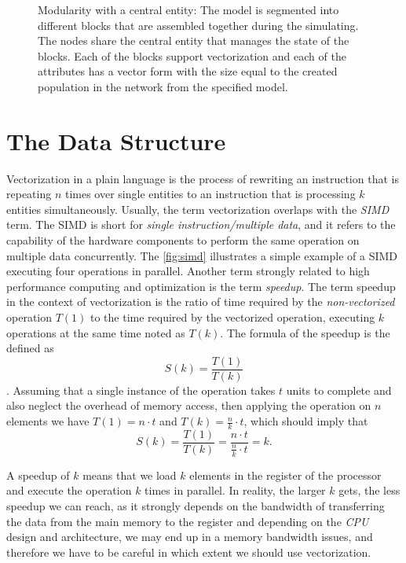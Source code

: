 \begin{figure}[ht!]
\begin{tikzpicture}[x=0.75pt,y=0.75pt,yscale=-1,xscale=1]
\end{tikzpicture}

    \caption{Modularity with a central entity: The model is segmented into different blocks that are assembled together during the simulating. The nodes share the central entity that manages the state of the blocks. Each of the blocks support vectorization and each of the attributes has a vector form with the size equal to the created population in the network from the specified model.}
    \label{fig:central_entity}
\end{figure}

\section{The Data Structure}

Vectorization in a plain language is the process of rewriting an instruction that is repeating $n$ times over single entities to an instruction that is processing $k$ entities simultaneously. Usually, the term vectorization overlaps with the \emph{SIMD} term. The SIMD is short for \emph{single instruction/multiple data}, and it refers to the capability of the hardware components to perform the same operation on multiple data concurrently. The \autoref{fig:simd} illustrates a simple example of a SIMD executing  four operations in parallel. Another term strongly related to high performance computing and optimization is the term \emph{speedup}. The term speedup in the context of vectorization is the ratio of time required by the \emph{non-vectorized} operation $T(1)$ to the time required by the vectorized operation, executing $k$ operations at the same time noted as $T(k)$. The formula of the speedup is the defined as $$S(k) = \frac{T(1)}{T(k)}$$. Assuming that a single instance of the operation takes $t$ units to complete and also neglect the overhead of memory access, then applying the operation on $n$ elements we have $T(1) = n \cdot t$ and $T(k) = \frac{n}{k} \cdot t$, which should imply that $$S(k) = \frac{T(1)}{T(k)} = \frac{n \cdot t}{\frac{n}{k} \cdot t} = k.$$

A speedup of $k$ means that we load $k$ elements in the register of the processor and execute the operation $k$ times in parallel. In reality, the larger $k$ gets, the less speedup we can reach, as it strongly depends on the bandwidth of transferring the data from the main memory to the register and depending on the \emph{CPU} design and architecture, we may end up in a memory bandwidth issues, and therefore we have to be careful in which extent we should use  vectorization.\\





